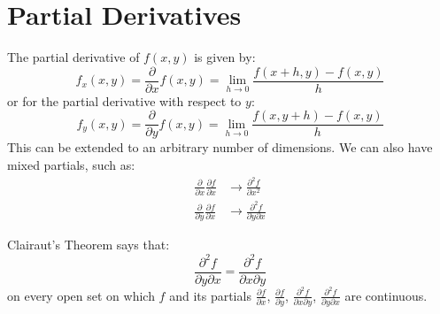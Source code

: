\documentclass{article}
\begin{document}
    \section{Partial Derivatives}
    The partial derivative of $f(x,y)$ is given by:
    \begin{equation}
        f_x(x,y) = \frac{\partial}{\partial x} f(x,y) = \lim_{h\to 0} \frac{f(x+h,y)-f(x,y)}{h}
    \end{equation}
    or for the partial derivative with respect to $y$:
    \begin{equation}
        f_y(x,y) = \frac{\partial}{\partial y}f(x,y) = \lim_{h\to 0} \frac{f(x,y+h)-f(x,y)}{h}
    \end{equation}
    This can be extended to an arbitrary number of dimensions. We can also have mixed partials, such as:
    \begin{align}
        \frac{\partial}{\partial x} \frac{\partial f}{\partial x} &\to \frac{\partial^2 f}{\partial x^2} \\ 
        \frac{\partial}{\partial y} \frac{\partial f}{\partial x} &\to \frac{\partial^2 f}{\partial y\partial x}
    \end{align}
    \begin{theorem}
        Clairaut's Theorem says that:
        \begin{equation}
            \frac{\partial^2 f}{\partial y\partial x} = \frac{\partial^2 f}{\partial x\partial y}
        \end{equation}
        on every open set on which $f$ and its partials $\frac{\partial f}{\partial x}$, $\frac{\partial f}{\partial y}$, $\frac{\partial^2 f}{\partial x\partial y}$, $\frac{\partial^2 f}{\partial y\partial x}$ are continuous.
    \end{theorem}
\end{document}
